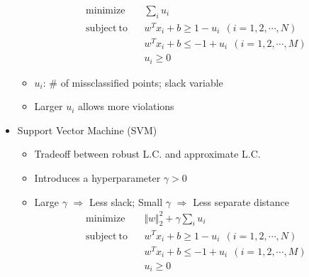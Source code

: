 \begin{itemize}
\begin{itemize}
\begin{equation}
\begin{aligned}
            \mathrm{minimize}~~&~~\sum_{i}u_i \\
            \mathrm{subject~to}~~&~~w^Tx_i+b\geq1-u_i~~(i=1,2,\cdots,N) \\
                &~~w^Tx_i+b\leq-1+u_i~~(i=1,2,\cdots,M) \\
                &~~u_i\geq 0
        \end{aligned}\end{equation}
        \item $u_i$: \# of missclassified points; slack variable
        \item Larger $u_i$ allows more violations
    \end{itemize}
    \item Support Vector Machine (SVM)
    \begin{itemize}
        \item Tradeoff between robust L.C. and approximate L.C.
        \item Introduces a hyperparameter $\gamma>0$
        \item Large $\gamma$ $\Rightarrow$ Less slack; Small $\gamma$ $\Rightarrow$ Less separate distance
        \begin{equation}\begin{aligned}
            \mathrm{minimize}~~&~~\Vert w\Vert_2^2+\gamma\sum_{i}u_i \\
            \mathrm{subject~to}~~&~~w^Tx_i+b\geq1-u_i~~(i=1,2,\cdots,N) \\
                &~~w^Tx_i+b\leq-1+u_i~~(i=1,2,\cdots,M) \\
                &~~u_i\geq0
        \end{aligned}\end{equation}
    \end{itemize}
\end{itemize}
\begin{figures}
\end{figures}

